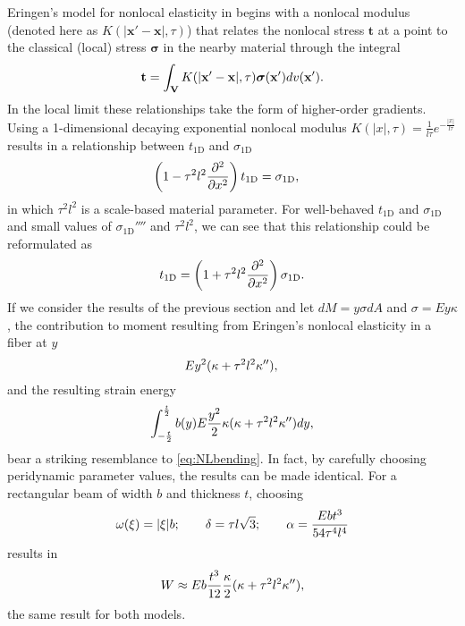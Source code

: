 Eringen's model for nonlocal elasticity in \cite{eringen1983differential} begins with a nonlocal modulus (denoted here as \(K(|\mathbf{x}'-\mathbf{x}|,\tau)\)) that relates the nonlocal stress \(\mathbf{t}\) at a point to the classical (local) stress \(\boldsymbol{\sigma}\) in the nearby material through the integral
\begin{equation}
\mathbf{t} = \int_\mathbf{V} K(|\mathbf{x}'-\mathbf{x}|,\tau)\boldsymbol{\sigma}(\mathbf{x}')dv(\mathbf{x}').\notag
\end{equation}
In the local limit these relationships take the form of higher-order gradients.
Using a 1-dimensional decaying exponential nonlocal modulus \(K(|x|,\tau)=\frac{1}{l\tau}e^{-\frac{|x|}{l\tau}}\)results in a relationship between \(t_\text{1D}\) and \(\sigma_\text{1D}\)
\begin{align}
\left(1-\tau^2l^2\frac{\partial^2}{\partial x^2}\right)t_\text{1D}&=\sigma_\text{1D},\notag
\end{align}
in which \(\tau^2l^2\) is a scale-based material parameter.
For well-behaved \(t_\text{1D}\) and \(\sigma_\text{1D}\) and small values of \(\sigma_\text{1D}''''\) and \(\tau^2l^2\), we can see that this relationship could be reformulated as
\begin{equation}
\label{eq:NLstress}
t_\text{1D}=\left(1+\tau^2l^2\frac{\partial^2}{\partial x^2}\right)\sigma_\text{1D}.\notag
\end{equation}
If we consider the results of the previous section and let \(dM = y\sigma dA\) and \(\sigma = Ey\kappa\), the contribution to moment resulting from Eringen's nonlocal elasticity in a fiber at \(y\)
\begin{equation}
\label{eq:EringenMoment}
E y^2 (\kappa+\tau^2l^2\kappa''), \\
\end{equation}
and the resulting strain energy
\begin{equation}
\label{eq:EringenEnergy}
\int_{-\frac{t}{2}}^{\frac{t}{2}} b(y) E \frac{y^2}{2} \kappa (\kappa+\tau^2l^2\kappa'')  dy,\notag
\end{equation}
bear a striking resemblance to \cref{eq:NLbending}.
In fact, by carefully choosing peridynamic parameter values, the results can be made identical.
For a rectangular beam of width \(b\) and thickness \(t\), choosing 
\begin{equation}
\omega(\xi) = |\xi|b ;\qquad \delta = \tau l \sqrt{3} ;\qquad \alpha = \frac{E b t^3}{54 \tau^4 l^4}\notag
\end{equation}
results in
\begin{equation}
W \approx E b \frac{t^3}{12} \frac{\kappa}{2}(\kappa+\tau^2 l^2 \kappa''), \notag
\end{equation}
the same result for both models.

